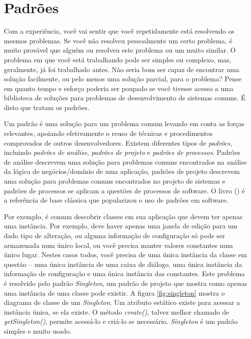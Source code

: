 \section{Padrões}

Com a experiência, você vai sentir que você repetidamente está resolvendo os mesmos problemas. Se você não resolveu pessoalmente um certo problema, é muito provável que alguém ou resolveu este problema ou um muito similar. O problema em que você está trabalhando pode ser simples ou complexo, mas, geralmente, já foi trabalhado antes. Não seria bom ser capaz de encontrar uma solução facilmente, ou pelo menos uma solução parcial, para o problema? Pense em quanto tempo e esforço poderia ser poupado se você tivesse acesso a uma biblioteca de soluções para problemas de desenvolvimento de sistemas comuns. É disto que tratam os padrões.

Um padrão é uma solução para um problema comum levando em conta as forças relevantes, apoiando efetivamente o reuso de técnicas e procedimentos comprovados de outros desenvolvedores. Existem diferentes tipos de \emph{padrões}, incluindo \emph{padrões de análise}, \emph{padrões de projeto} e \emph{padrões de processos}. Padrões de análise descrevem uma solução para problemas comuns encontrados na análise da lógica de negócios/domínio de uma aplicação, padrões de projeto descrevem uma solução para problemas comuns encontrados no projeto de sistemas e padrões de processos se aplicam a questões de processos de software. O livro () é a referência de base clássica que popularizou o uso de padrões em software.

Por exemplo, é comum descobrir classes em sua aplicação que devem ter apenas uma instância. Por exemplo, deve haver apenas uma janela de edição para um dado tipo de alteração, ou alguma informação de configuração só pode ser armazenada num único local, ou você precisa manter valores constantes num único lugar. Nestes casos todos, você precisa de uma única instância da classe em questão -- uma única instância de uma caixa de diálogo, uma única instância da informação de configuração e uma única instância das constantes. Este problema é resolvido pelo padrão \emph{Singleton}\label{p:singleton}, um padrão de projeto que mostra como apenas uma instância de uma classe pode existir. A figura \ref{fig:singleton} mostra o diagrama de classe de um \emph{Singleton}. Um atributo estático existe para acessar a instância única, se ela existe. O método \emph{create()}, talvez melhor chamado de \emph{getSingleton()}, permite acessá-lo e criá-lo se necessário. \emph{Singleton} é um padrão simples e muito usado.

